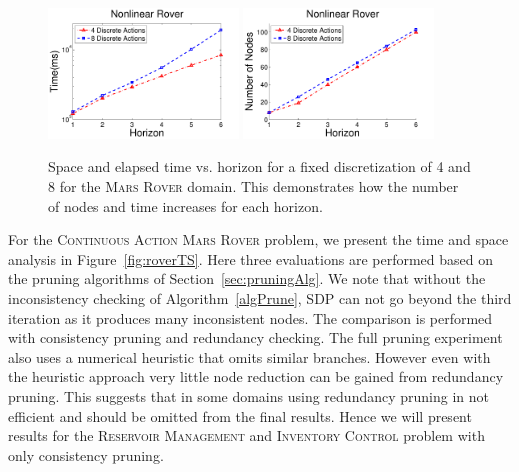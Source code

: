 \documentclass[twoside,11pt]{article}
\newcommand{\MarsRover}{\textsc{Mars Rover }}
\newcommand{\InventoryControl}{\textsc{Inventory Control }}
\newcommand{\WaterReservoir}{\textsc{Reservoir Management }}
\begin{document}
\begin{figure}[tbp!]
\vspace{2mm}
\centering
\includegraphics[width=0.45\textwidth]{pics/DisRoverNode.pdf}
\hspace{2mm}
\includegraphics[width=0.45\textwidth]{pics/DisRoverTime.pdf}
\vspace{-2mm}
\caption{%
Space and elapsed time vs. horizon for a fixed discretization of 4 and 8 for the \MarsRover domain. This demonstrates how the number of nodes and time increases for each horizon. 
}
\label{fig:roverDisTS}
\vspace{-1mm}
\end{figure}

For the \textsc{Continuous Action} \MarsRover problem, we present the time and space analysis in Figure~\ref{fig:roverTS}. Here three evaluations are performed based on the pruning algorithms of Section~\ref{sec:pruningAlg}. We note that without the inconsistency checking of Algorithm~\ref{algPrune}, SDP can not go beyond the third iteration as it produces many inconsistent nodes. The comparison is performed with consistency pruning and redundancy checking. The full pruning experiment also uses a numerical heuristic that omits similar branches. %
However even with the heuristic approach very little node reduction can be gained from redundancy pruning. This suggests that in some domains using redundancy pruning in not efficient and should be omitted from the final results. 
Hence we will present results for the \WaterReservoir and \InventoryControl problem with only consistency pruning. 
\end{document}
